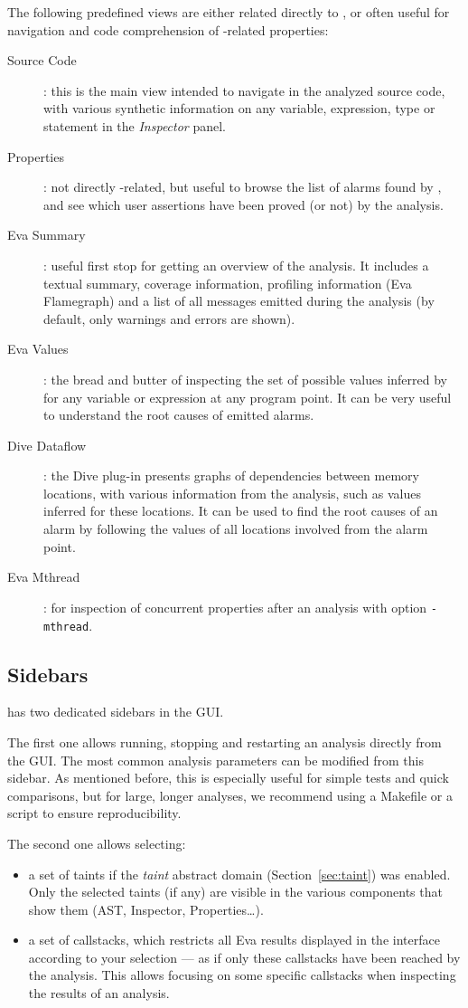 The following predefined views are either related directly to \Eva{},
or often useful for navigation and code comprehension of \Eva{}-related properties:

\begin{description}
\item[Source Code]: this is the main view intended to navigate in the analyzed
source code, with various synthetic information on any variable, expression,
type or statement in the \emph{Inspector} panel.
\item[Properties]: not directly \Eva{}-related, but useful to browse the list
of alarms found by \Eva{}, and see which user assertions have been proved
(or not) by the analysis.
\item[Eva Summary]: useful first stop for getting an overview of the
analysis. It includes a textual summary, coverage information, profiling
information (Eva Flamegraph) and a list of all messages emitted during the analysis
(by default, only warnings and errors are shown).
\item[Eva Values]: the bread and butter of inspecting the set of possible values
inferred by \Eva{} for any variable or expression at any program point. It can
be very useful to understand the root causes of emitted alarms.
\item[Dive Dataflow]: the Dive plug-in presents graphs of dependencies
between memory locations, with various information from the \Eva{} analysis,
such as values inferred for these locations. It can be used to find the root
causes of an alarm by following the values of all locations involved from the
alarm point.
\item[Eva Mthread]: for inspection of concurrent properties after an analysis
with option \texttt{-mthread}.
\end{description}

\subsection{Sidebars}

\Eva{} has two dedicated sidebars in the \FramaC GUI.

The first one allows running, stopping and
restarting an analysis directly from the GUI. The most common analysis
parameters can be modified from this sidebar. As mentioned before, this is
especially useful for simple tests and quick comparisons, but for large,
longer analyses, we recommend using a Makefile or a script to ensure
reproducibility.

The second one allows selecting:
\begin{itemize}
\item a set of taints if the {\em taint} abstract domain (Section~\ref{sec:taint})
  was enabled. Only the selected taints (if any) are visible in the various
  components that show them (AST, Inspector, Properties…).
\item a set of callstacks, which restricts all Eva results displayed in the
  interface according to your selection — as if only these callstacks have been
  reached by the analysis. This allows focusing on some specific callstacks
  when inspecting the results of an analysis.
\end{itemize}
